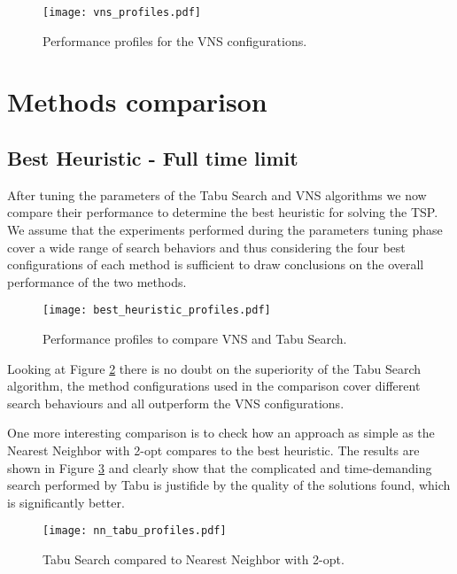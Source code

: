 \begin{figure}[H]
  \centering
  \texttt{[image: vns\_profiles.pdf]}
  \caption{Performance profiles for the VNS configurations.}
  \label{fig:vns-profiles}
\end{figure}

\section{Methods comparison}

\subsection{Best Heuristic - Full time limit}

After tuning the parameters of the Tabu Search and VNS algorithms we now compare their performance to determine the best heuristic for solving the TSP. We assume that the experiments performed during the parameters tuning phase cover a wide range of search behaviors and thus considering the four best configurations of each method is sufficient to draw conclusions on the overall performance of the two methods.

\begin{figure}[h]
  \centering
  \texttt{[image: best\_heuristic\_profiles.pdf]}
  \caption{Performance profiles to compare VNS and Tabu Search.}
  \label{fig:best-heuristic-profiles}
\end{figure}

Looking at Figure \ref{fig:best-heuristic-profiles} there is no doubt on the superiority of the Tabu Search algorithm, the method configurations used in the comparison cover different search behaviours and all outperform the VNS configurations.

One more interesting comparison is to check how an approach as simple as the Nearest Neighbor with 2-opt compares to the best heuristic. The results are shown in Figure \ref{fig:nn-vs-best-heuristic} and clearly show that the complicated and time-demanding search performed by Tabu is justifide by the quality of the solutions found, which is significantly better.

\begin{figure}[H]
  \centering
  \texttt{[image: nn\_tabu\_profiles.pdf]}
  \caption{Tabu Search compared to Nearest Neighbor with 2-opt.}
  \label{fig:nn-vs-best-heuristic}
\end{figure}

